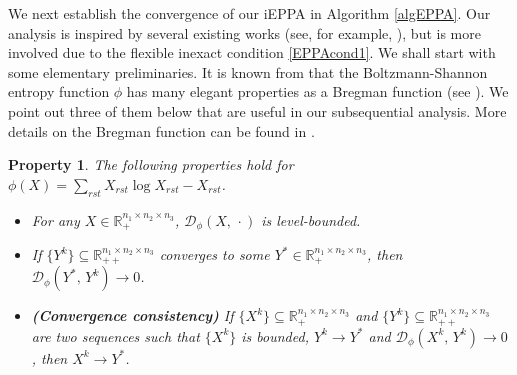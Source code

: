 \documentclass[10pt]{article}
\newcommand{\red}[1]{\begin{color}{red}#1\end{color}}
\newtheorem{property}{Property}
\begin{document}

We next establish the convergence of our iEPPA in Algorithm \ref{algEPPA}. Our analysis is inspired by several existing works (see, for example, \cite{e1998approximate,t1997convergence}), but is more involved due to the flexible inexact condition \eqref{EPPAcond1}. We shall start with some elementary preliminaries. It is known from \cite[Section 6.1]{cl1981iterative} that the Boltzmann-Shannon entropy function $\phi$ has many elegant properties as a Bregman function (see \cite[Definition 2.1]{cl1981iterative}). We point out three of them below that are useful in our subsequential analysis. More details on the Bregman function can be found in \cite[Section 4]{bb1997legendre}.


\begin{property}\label{phipros}
The following properties hold for $\phi(X)=\sum_{rst}X_{rst}\log X_{rst} - X_{rst}$.
\begin{itemize}
\item[{\rm (i)}] For any $X\in\mathbb{R}_{+}^{n_1 \times n_2 \times n_3}$, $\mathcal{D}_{\phi}(X,\,\cdot)$ is level-bounded.

\item[{\rm (ii)}] If $\{Y^k\}\subseteq\mathbb{R}_{++}^{n_1 \times n_2 \times n_3}$ converges to some $Y^{*}\in\mathbb{R}_{+}^{n_1 \times n_2 \times n_3}$, then $\mathcal{D}_{\phi}(Y^{*},\,Y^k)\to0$.

\item[{\rm (iii)}] \textbf{(Convergence consistency)} If $\{X^k\}\subseteq\mathbb{R}_{+}^{n_1 \times n_2 \times n_3}$ and $\{Y^k\}\subseteq\mathbb{R}_{++}^{n_1 \times n_2 \times n_3}$ are two sequences such that $\{X^k\}$ is bounded, $Y^k\to Y^{*}$ and $\mathcal{D}_{\phi}(X^k,\,Y^k)\to0$, then $X^k\to Y^{*}$.

\end{itemize}
\end{property}
\end{document}
